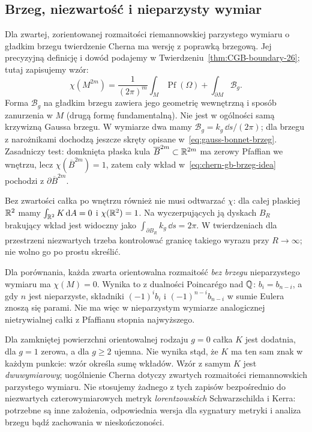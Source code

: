 \subsection*{Brzeg, niezwartość i nieparzysty wymiar}

Dla zwartej, zorientowanej rozmaitości riemannowskiej
parzystego wymiaru o gładkim brzegu twierdzenie Cherna
ma wersję z poprawką brzegową. Jej precyzyjną definicję
i dowód podajemy w
Twierdzeniu~\ref{thm:CGB-boundary-26}; tutaj zapisujemy wzór:
\begin{equation}\label{eq:chern-gb-brzeg-idea}
 \chi(M^{2m})=
 \frac1{(2\pi)^m}\int_M\operatorname{Pf}(\Omega)
 +\int_{\partial M}\mathcal B_g.
\end{equation}
Forma $\mathcal B_g$ na gładkim brzegu zawiera jego
geometrię wewnętrzną i sposób zanurzenia w $M$
(drugą formę fundamentalną). Nie jest w ogólności
samą krzywizną Gaussa brzegu. W wymiarze dwa mamy
$\mathcal B_g=k_g\,\dd s/(2\pi)$; dla brzegu
z narożnikami dochodzą jeszcze skręty opisane
w~\eqref{eq:gauss-bonnet-brzeg}. Zasadniczy test:
domknięta płaska kula $\overline B^{2m}\subset\mathbb{R}^{2m}$
ma zerowy Pfaffian we wnętrzu, lecz $\chi(\overline B^{2m})=1$,
zatem cały wkład w~\eqref{eq:chern-gb-brzeg-idea}
pochodzi z $\partial\overline B^{2m}$.

Bez zwartości całka po wnętrzu również nie musi
odtwarzać $\chi$: dla całej płaskiej $\mathbb{R}^2$
mamy $\int_{\mathbb{R}^2}K\,\mathrm d A=0$ i $\chi(\mathbb{R}^2)=1$.
Na wyczerpujących ją dyskach $B_R$ brakujący wkład
jest widoczny jako $\int_{\partial B_R}k_g\,\dd s=2\pi$.
W twierdzeniach dla przestrzeni niezwartych trzeba
kontrolować granicę takiego wyrazu przy $R\to\infty$;
nie wolno go po prostu skreślić.

Dla porównania, każda zwarta orientowalna rozmaitość
\emph{bez brzegu} nieparzystego wymiaru ma $\chi(M)=0$.
Wynika to z dualności Poincarégo nad $\mathbb{Q}$:
$b_i=b_{n-i}$, a gdy $n$ jest nieparzyste,
składniki $(-1)^i b_i$ i $(-1)^{n-i}b_{n-i}$
w sumie Eulera znoszą się parami. Nie ma więc
w nieparzystym wymiarze analogicznej nietrywialnej
całki z Pfaffianu stopnia najwyższego.

\begin{uwaga}
Dla zamkniętej powierzchni orientowalnej rodzaju $g=0$
całka $K$ jest dodatnia, dla $g=1$ zerowa, a dla
$g\geq2$ ujemna. Nie wynika stąd, że $K$ ma ten sam
znak w każdym punkcie: wzór określa sumę wkładów.
Wzór z samym $K$ jest \emph{dwuwymiarowy};
uogólnienie Cherna dotyczy zwartych rozmaitości
riemannowskich parzystego wymiaru. Nie stosujemy
żadnego z tych zapisów bezpośrednio do niezwartych
czterowymiarowych metryk \emph{lorentzowskich}
Schwarzschilda i Kerra: potrzebne są inne założenia,
odpowiednia wersja dla sygnatury metryki i analiza brzegu
bądź zachowania w nieskończoności.
\end{uwaga}

